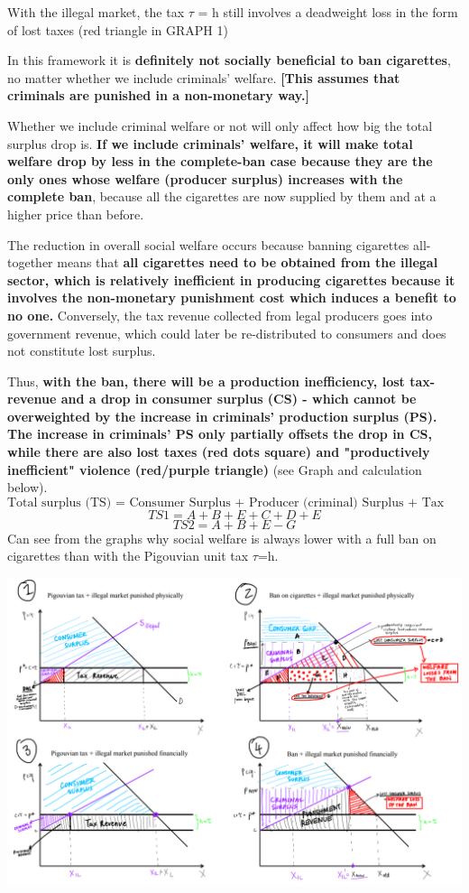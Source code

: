 \documentclass{article}
\begin{document}
With the illegal market, the tax $\tau$ = h still involves a deadweight
loss in the form of lost taxes (red triangle in GRAPH 1)

In this framework it is \textbf{definitely not socially beneficial to
  ban cigarettes}, no matter whether we include criminals'
welfare. \textbf{[This assumes that criminals are punished in a
  non-monetary way.]}

Whether we include criminal welfare or not will only affect how big
the total surplus drop is. \textbf{If we include criminals' welfare,
  it will make total welfare drop by less in the complete-ban case
  because they are the only ones whose welfare (producer surplus)
  increases with the complete ban}, because all the cigarettes are now
supplied by them and at a higher price than before.

The reduction in overall social welfare occurs because banning
cigarettes all-together means that \textbf{all cigarettes need to be
  obtained from the illegal sector, which is relatively inefficient in
  producing cigarettes because it involves the non-monetary punishment
  cost which induces a benefit to no one.} Conversely, the tax revenue
collected from legal producers goes into government revenue, which
could later be re-distributed to consumers and does not constitute
lost surplus.

Thus, \textbf{with the ban, there will be a production inefficiency,
  lost tax-revenue and a drop in consumer surplus (CS) - which cannot
  be overweighted by the increase in criminals' production surplus
  (PS). The increase in criminals' PS only partially offsets the drop
  in CS, while there are also lost taxes (red dots square) and
  "productively inefficient" violence (red/purple triangle)} (see
Graph and calculation below).
$$\text{Total surplus (TS) = Consumer Surplus +  Producer (criminal) Surplus + Tax Revenue - Health Cost}$$
$$TS1= A+B+E+C+D+E$$
$$TS2= A+B+E-G$$
Can see from the graphs why social welfare is always lower with a full
ban on cigarettes than with the Pigouvian unit tax $\tau$=h.


\includegraphics[width=\textwidth]{Graph3.png}
\end{document}
